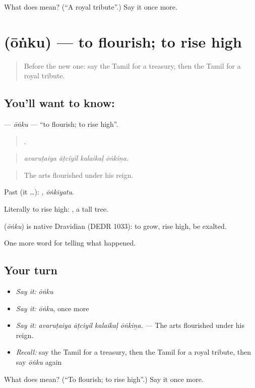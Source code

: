 \begin{tcolorbox}[breakable,colback=teal!4,colframe=teal!35!black,title={Before you move on}]
What does  mean? (\textquotedblleft{}A royal tribute\textquotedblright{}.) Say it once more.
\end{tcolorbox}
\section[\texorpdfstring{\ta{ஓங்கு} (ōṅku)}{ஓங்கு (ōṅku)}]{ (ōṅku) — to flourish; to rise high}

\label{lesson:TA-C330-onku}



\begin{quote}
Before the new one: say the Tamil for a treasury, then the Tamil for a royal tribute.
\end{quote}

\subsection*{You'll want to know: }
\textbf{} — \emph{ōṅku} — \textquotedblleft{}to flourish; to rise high\textquotedblright{}.

\begin{quote}
   .
\end{quote}

\begin{quote}
\emph{avaruṭaiya āṭciyil kalaikaḷ ōṅkiṉa.}
\end{quote}

\begin{quote}
The arts flourished under his reign.
\end{quote}

Past (it …): , \emph{ōṅkiyatu}.

Literally to rise high:   , a tall tree.

\begin{cousinweb}
\textbf{} (\emph{ōṅku}) is native Dravidian (DEDR 1033): to grow, rise high, be exalted.
\end{cousinweb}

\begin{grammarlens}[title={What you've built}]
One more word for telling what happened.
\end{grammarlens}

\subsection*{Your turn}
\begin{itemize}
\raggedright
  \item \emph{Say it:} \emph{ōṅku}
  \item \emph{Say it:} \emph{ōṅku}, once more
  \item \emph{Say it:} \emph{avaruṭaiya āṭciyil kalaikaḷ ōṅkiṉa.} — The arts flourished under his reign.
  \item \emph{Recall:} say the Tamil for a treasury, then the Tamil for a royal tribute, then say \emph{ōṅku} again
\end{itemize}

\begin{tcolorbox}[breakable,colback=teal!4,colframe=teal!35!black,title={Before you move on}]
What does  mean? (\textquotedblleft{}To flourish; to rise high\textquotedblright{}.) Say it once more.
\end{tcolorbox}
